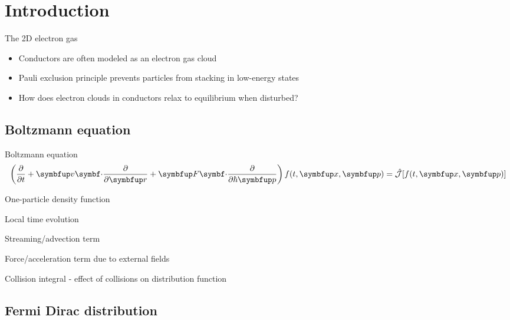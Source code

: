 \section{Introduction}

\begin{frame}{The 2D electron gas}
  \begin{itemize}
    \item Conductors are often modeled as an \alert{electron gas cloud}
    \item Pauli exclusion principle prevents particles from stacking in low-energy states
    \item \alert{How does electron clouds in conductors relax to equilibrium when disturbed?}
  \end{itemize}
\end{frame}

\subsection{Boltzmann equation}

\begin{frame}
  \begin{blk}{Boltzmann equation}
    \begin{equation}
      \left(\pdv{}{t} + \vv{v} \vdot \pdv{}{\vv{r}} + \vv{F} \vdot \pdv{}{\hbar\vv{p}}\right) f(t,\vv{x},\vv{p}) = \hat{\mathcal{J}}[f(t,\vv{x},\vv{p})]
    \end{equation}
  \end{blk}

  \begin{description}
    \item[\(f(t, \vv{x}, \vv{p})\):] One-particle density function
    \item[\(\pdv{f}{t}\):] Local time evolution
    \item[\(\vv{v} \vdot \pdv{f}{\vv{r}}\):] Streaming/advection term
    \item[\(\vv{F} \vdot \pdv{f}{\hbar\vv{p}}\):] Force/acceleration term due to external fields
    \item[\(\hat{\mathcal{J}}\lbrack f \rbrack\):] Collision integral - effect of collisions on distribution function
  \end{description}
\end{frame}

\subsection{Fermi Dirac distribution}


